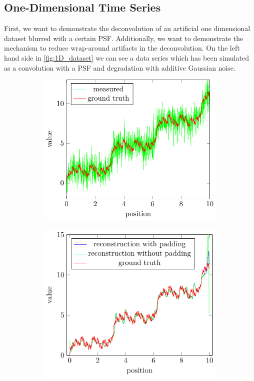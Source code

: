 \documentclass{juliacon}
\begin{document}
    \subsection{One-Dimensional Time Series}
        First, we want to demonstrate the deconvolution of an artificial one dimensional dataset blurred with a certain PSF.
        Additionally, we want to demonstrate the mechanism to reduce wrap-around artifacts in the deconvolution.
        On the left hand side in \autoref{fig:1D_dataset} we can see a data series which has been simulated 
        as a convolution with a PSF and degradation with additive Gaussian noise.
        \begin{figure}[H]
            \begin{subfigure}[b]{.25\textwidth}
                \centering
                \includegraphics[width=\textwidth]{figures/1d_plot_data_blurred.pdf}
                \caption{}
                \label{fig:1D_dataseta}
            \end{subfigure}%
            \begin{subfigure}[b]{.25\textwidth}
                \centering
                \includegraphics[width=\textwidth]{figures/1d_plot_data_res_pad_vs_nopad.pdf}

\end{subfigure}
\end{figure}
\end{document}

